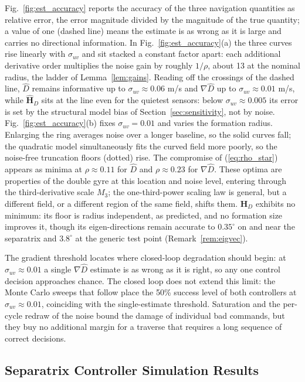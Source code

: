 \documentclass[lettersize,journal]{IEEEtran}
\begin{document}
Fig.~\ref{fig:est_accuracy} reports the accuracy of the three navigation
quantities as relative error, the error magnitude divided by the
magnitude of the true quantity; a value of one (dashed line) means the
estimate is as wrong as it is large and carries no directional
information. In Fig.~\ref{fig:est_accuracy}(a) the three curves rise
linearly with $\sigma_{uv}$ and sit stacked a constant factor apart: each
additional derivative order multiplies the noise gain by roughly
$1/\rho$, about 13 at the nominal radius, the ladder of
Lemma~\ref{lem:gains}. Reading off the crossings of the dashed line,
$\hat{D}$ remains informative up to $\sigma_{uv} \approx 0.06$ m/s and
$\nabla\hat{D}$ up to $\sigma_{uv} \approx 0.01$ m/s, while
$\hat{\mathbf{H}}_D$ sits at the line even for the quietest sensors:
below $\sigma_{uv} \approx 0.005$ its error is set by the structural
model bias of Section~\ref{sec:sensitivity}, not by noise.
Fig.~\ref{fig:est_accuracy}(b) fixes $\sigma_{uv} = 0.01$ and varies the
formation radius. Enlarging the ring averages noise over a longer
baseline, so the solid curves fall; the quadratic model simultaneously
fits the curved field more poorly, so the noise-free truncation floors
(dotted) rise. The compromise of (\ref{eq:rho_star}) appears as minima
at $\rho \approx 0.11$ for $\hat{D}$ and $\rho \approx 0.23$ for
$\nabla\hat{D}$. These optima are properties of the double gyre at this
location and noise level, entering through the third-derivative scale
$M_3$; the one-third-power scaling law is general, but a different
field, or a different region of the same field, shifts them.
$\hat{\mathbf{H}}_D$ exhibits no minimum: its floor is radius
independent, as predicted, and no formation size improves it, though its
eigen-directions remain accurate to $0.35^\circ$ on and near the
separatrix and $3.8^\circ$ at the generic test point
(Remark~\ref{rem:eigvec}).

The gradient threshold locates where closed-loop degradation should
begin: at $\sigma_{uv} \approx 0.01$ a single $\nabla\hat{D}$ estimate
is as wrong as it is right, so any one control decision approaches
chance. The closed loop does not extend this limit: the Monte Carlo
sweeps that follow place the 50\% success level of both controllers at
$\sigma_{uv} \approx 0.01$, coinciding with the single-estimate
threshold. Saturation and the per-cycle redraw of the noise bound the
damage of individual bad commands, but they buy no additional margin
for a traverse that requires a long sequence of correct decisions.

\subsection{Separatrix Controller Simulation Results}
\end{document}
